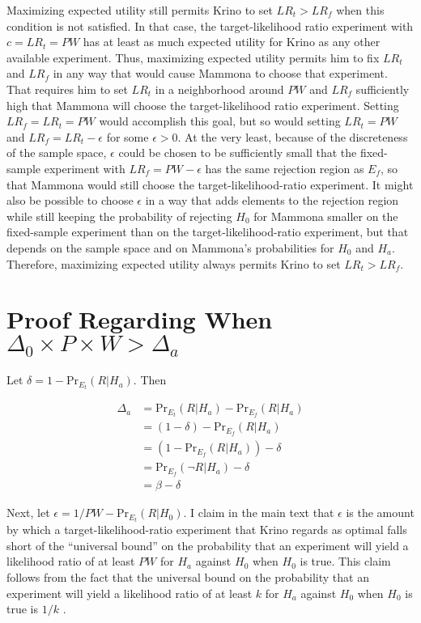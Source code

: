 \documentclass{article}
\theoremstyle{definition}
\begin{document}
Maximizing expected utility still permits Krino to set $LR_t>LR_f$ when this condition is not satisfied.
In that case, the target-likelihood ratio experiment with $c=LR_t=P W$ has at least as much expected utility for Krino as any other available experiment.
Thus, maximizing expected utility permits him to fix $LR_t$ and $LR_f$ in any way that would cause Mammona to choose that experiment.
That requires him to set $LR_t$ in a neighborhood around $P W$ and $LR_f$ sufficiently high that Mammona will choose the target-likelihood ratio experiment.
Setting $LR_f=LR_t=P W$ would accomplish this goal, but so would setting $LR_t=P W$ and $LR_f=LR_t-\epsilon$ for some $\epsilon>0$.
At the very least, because of the discreteness of the sample space, $\epsilon$ could be chosen to be sufficiently small that the fixed-sample experiment with $LR_f=P W-\epsilon$ has the same rejection region as $E_f$, so that Mammona would still choose the target-likelihood-ratio experiment.
It might also be possible to choose $\epsilon$ in a way that adds elements to the rejection region while still keeping the probability of rejecting $H_0$ for Mammona smaller on the fixed-sample experiment than on the target-likelihood-ratio experiment, but that depends on the sample space and on Mammona's probabilities for $H_0$ and $H_a$.
Therefore, maximizing expected utility always permits Krino to set $LR_t>LR_f$.

\section{Proof Regarding When $\Delta_0\times P\times W>\Delta_a$}\label{app:delta}

Let $\delta=1-\mbox{Pr}_{E_t}(R|H_a)$.
Then

\begin{align*}
\Delta_a &=\mbox{Pr}_{E_t}(R|H_a)-\mbox{Pr}_{E_f}(R|H_a)\\
&= (1-\delta)-\mbox{Pr}_{E_f}(R|H_a)\\
&= (1-\mbox{Pr}_{E_f}(R|H_a))-\delta\\
&= \mbox{Pr}_{E_f}(\neg R|H_a)-\delta\\
&= \beta-\delta
\end{align*}

Next, let $\epsilon=1/PW-\mbox{Pr}_{E_t}(R|H_0)$. I claim in the main text that $\epsilon$ is the amount by which a target-likelihood-ratio experiment that Krino regards as optimal falls short of the ``universal bound'' on the probability that an experiment will yield a likelihood ratio of at least $P W$ for $H_a$ against $H_0$ when $H_0$ is true. This claim follows from the fact that the universal bound on the probability that an experiment will yield a likelihood ratio of at least $k$ for $H_a$ against $H_0$ when $H_0$ is true is $1/k$ \citep{robbins70}.
\end{document}
